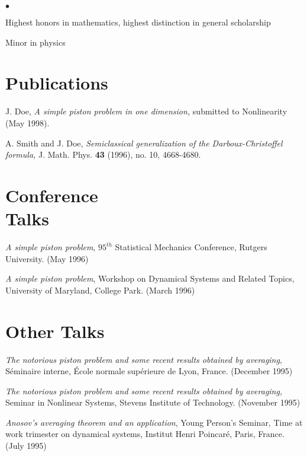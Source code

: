\documentclass[margin,line,pifont,palatino,courier]{res}
\newenvironment{list1}{
  \begin{list}{\ding{113}}{%
      \setlength{\itemsep}{0in}
      \setlength{\parsep}{0in} \setlength{\parskip}{0in}
      \setlength{\topsep}{0in} \setlength{\partopsep}{0in}
      \setlength{\leftmargin}{0.17in}}}{\end{list}}
\newenvironment{list2}{
  \begin{list}{$\bullet$}{%
      \setlength{\itemsep}{0in}
      \setlength{\parsep}{0in} \setlength{\parskip}{0in}
      \setlength{\topsep}{0in} \setlength{\partopsep}{0in}
      \setlength{\leftmargin}{0.2in}}}{\end{list}}
\begin{document}
\begin{resume}
\begin{list1}
\begin{list2}
\vspace*{.05in}
\item Highest honors in mathematics, highest distinction in general
scholarship
\item Minor in physics
\end{list2}

\end{list1}






\section{\sc Publications}

J. Doe,  \textit{A simple piston problem in one dimension,}
submitted to Nonlinearity (May 1998).


A. Smith and J. Doe,  \textit{Semiclassical generalization
of the Darboux-Christoffel formula,} J. Math. Phys. \textbf{43}
(1996), no. 10, 4668-4680.


\section{\sc Conference \\ Talks}

\emph{A simple piston problem}, $95^ {th} $ Statistical Mechanics
Conference, Rutgers University. (May 1996)

\emph{A simple piston problem}, Workshop on Dynamical Systems and
Related Topics, University of Maryland, College Park. (March 1996)







\section{\sc Other Talks}

\emph{The notorious piston problem and some recent results obtained
by averaging}, Séminaire interne, École normale supérieure de Lyon,
France. (December 1995)

\emph{The notorious piston problem and some recent results obtained
by averaging}, Seminar in Nonlinear Systems, Stevens Institute of
Technology. (November 1995)

\emph{Anosov's averaging theorem and an application}, Young Person's
Seminar, Time at work trimester on dynamical systems, Institut Henri
Poincaré, Paris, France. (July 1995)


\end{resume}
\end{document}
